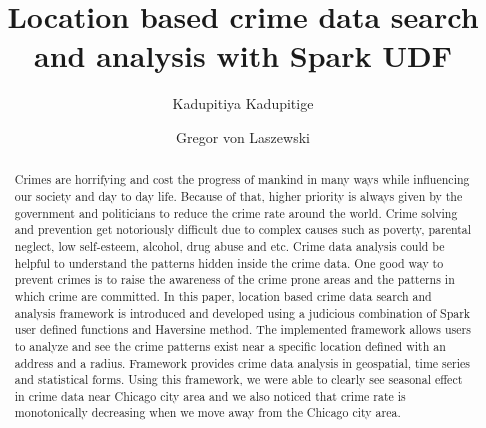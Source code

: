 
\title{Location based crime data search and analysis with Spark UDF}


\author{Kadupitiya Kadupitige}

\author{Gregor von Laszewski}


\renewcommand{\shortauthors}{G. v. Laszewski}


\begin{abstract}
	
Crimes are horrifying and cost the progress of mankind in many ways
while influencing our society and day to day life. Because of that,
higher priority is always given by the government and politicians to
reduce the crime rate around the world. Crime solving and prevention
get notoriously difficult due to complex causes such as poverty,
parental neglect, low self-esteem, alcohol, drug abuse and etc. Crime
data analysis could be helpful to understand the patterns hidden
inside the crime data. One good way to prevent crimes is to raise the
awareness of the crime prone areas and the patterns in which crime are
committed.  In this paper, location based crime data search and
analysis framework is introduced and developed using a judicious
combination of Spark user defined functions and Haversine method. The
implemented framework allows users to analyze and see the crime
patterns exist near a specific location defined with an address and a
radius. Framework provides crime data analysis in geospatial, time
series and statistical forms. Using this framework, we were able to
clearly see seasonal effect in crime data near Chicago city area and
we also noticed that crime rate is monotonically decreasing when we
move away from the Chicago city area.

\end{abstract}



\maketitle


